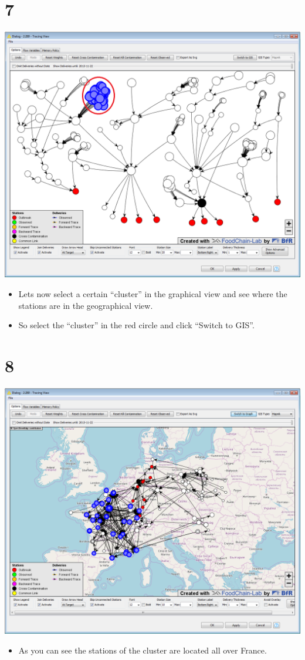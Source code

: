 \documentclass[10pt]{beamer}
\begin{document}
\section{7}
\begin{frame}
	\begin{center}
  		\includegraphics[height=0.6\textheight]{7.png}
	\end{center}
	\begin{itemize}
		\item Lets now select a certain ``cluster'' in the graphical view and see where the stations are in the geographical view.
		\item So select the ``cluster'' in the red circle and click ``Switch to GIS''.
	\end{itemize}
\end{frame}

\section{8}
\begin{frame}
	\begin{center}
  		\includegraphics[height=0.6\textheight]{8.png}
	\end{center}
	\begin{itemize}
		\item As you can see the stations of the cluster are located all over France.
	\end{itemize}
\end{frame}
\end{document}
